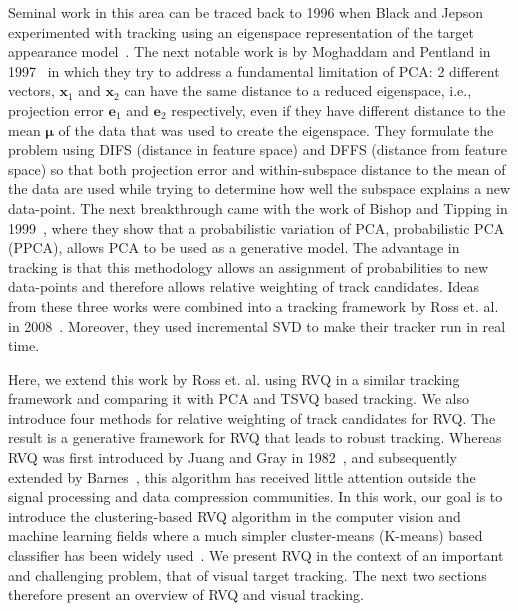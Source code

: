 \documentclass{article}
\begin{document}
Seminal work in this area can be traced back to 1996 when Black and Jepson experimented with tracking using an eigenspace representation of the target appearance model~\cite{1998_JNL_Eigentracking_Black}.  The next notable work is by Moghaddam and Pentland in 1997~\cite{1997_JNL_EigenTRK_Moghaddam} in which they try to address a fundamental limitation of PCA: 2 different vectors, $\mathbf{x}_1$ and $\mathbf{x}_2$ can have the same distance to a reduced eigenspace, i.e., projection error $\mathbf{e}_1$ and $\mathbf{e}_2$ respectively, even if they have different distance to the mean $\boldsymbol\mu$ of the data that was used to create the eigenspace.  They formulate the problem using DIFS (distance in feature space) and DFFS (distance from feature space) so that both projection error and within-subspace distance to the mean of the data are used while trying to determine how well the subspace explains a new data-point.  The next breakthrough came with the work of Bishop and Tipping in 1999~\cite{1999_JNL_PPCA_Tipping}, where they show that a probabilistic variation of PCA, probabilistic PCA (PPCA), allows PCA to be used as a generative model.  The advantage in tracking is that this methodology allows an assignment of probabilities to new data-points and therefore allows relative weighting of track candidates.  Ideas from these three works were combined into a tracking framework by Ross et. al. in 2008~\cite{2008_JNL_subspaceTRK_Ross}.  Moreover, they used incremental SVD to make their tracker run in real time.  

Here, we extend this work by Ross et. al. using RVQ in a similar tracking framework and comparing it with PCA and TSVQ based tracking.  We also introduce four methods for relative weighting of track candidates for RVQ.  The result is a generative framework for RVQ that leads to robust tracking.  Whereas RVQ was first introduced by Juang and Gray in 1982~\cite{1982_CNF_SpeechRVQ_JuangGray}, and subsequently extended by Barnes~\cite{1996_JNL_AdvancesRVQ_Barnes,2007_JNL_IDDM_Barnes}, this algorithm has received little attention outside the signal processing and data compression communities.  In this work, our goal is to introduce the clustering-based RVQ algorithm in the computer vision and machine learning fields where a much simpler cluster-means (K-means) based classifier has been widely used~\cite{2008_JNL_PRML_Wu}.  We present RVQ in the context of an important and challenging problem, that of visual target tracking.  The next two sections therefore present an overview of RVQ and visual tracking.
\end{document}
